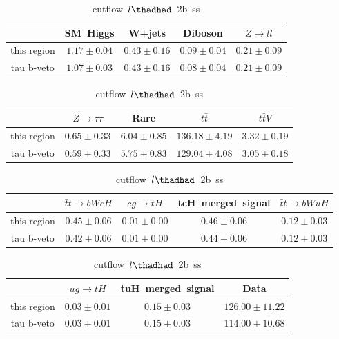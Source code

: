 \begin{table}
\caption{cutflow~$l\thadhad$~2b~ss}
\centering
\begin{tabular}{|c|c|c|c|c|} \hline
 & SM~Higgs & W+jets & Diboson & $Z\to ll$\\\hline
this region & $1.17\pm0.04$ & $0.43\pm0.16$ & $0.09\pm0.04$ & $0.21\pm0.09$\\\hline
tau b-veto & $1.07\pm0.03$ & $0.43\pm0.16$ & $0.08\pm0.04$ & $0.21\pm0.09$\\\hline
\end{tabular}
\begin{tabular}{|c|c|c|c|c|} \hline
 & $Z\to \tau\tau$ & Rare & $t\bar{t}$ & $t\bar{t}V$\\\hline
this region & $0.65\pm0.33$ & $6.04\pm0.85$ & $136.18\pm4.19$ & $3.32\pm0.19$\\\hline
tau b-veto & $0.59\pm0.33$ & $5.75\pm0.83$ & $129.04\pm4.08$ & $3.05\pm0.18$\\\hline
\end{tabular}
\begin{tabular}{|c|c|c|c|c|} \hline
 & $\bar{t}t\to bWcH$ & $cg\to tH$ & tcH~merged~signal & $\bar{t}t\to bWuH$\\\hline
this region & $0.45\pm0.06$ & $0.01\pm0.00$ & $0.46\pm0.06$ & $0.12\pm0.03$\\\hline
tau b-veto & $0.42\pm0.06$ & $0.01\pm0.00$ & $0.44\pm0.06$ & $0.12\pm0.03$\\\hline
\end{tabular}
\begin{tabular}{|c|c|c|c|} \hline
 & $ug\to tH$ & tuH~merged~signal & Data\\\hline
this region & $0.03\pm0.01$ & $0.15\pm0.03$ & $126.00\pm11.22$\\\hline
tau b-veto & $0.03\pm0.01$ & $0.15\pm0.03$ & $114.00\pm10.68$\\\hline
\end{tabular}
\label{tab:cutflow_reg1l2tau2bnj_ss}
\end{table}
